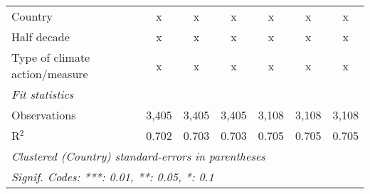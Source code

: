 \begin{tabular}{lcccccc}
   Country                                                 & x       & x             & x             & x             & x             & x\\  
   Half decade                                             & x       & x             & x             & x             & x             & x\\  
   Type of climate action/measure                          & x       & x             & x             & x             & x             & x\\  
   \midrule \emph{Fit statistics}\\
   Observations                                            & 3,405   & 3,405         & 3,405         & 3,108         & 3,108         & 3,108\\  
   R$^2$                                                   & 0.702   & 0.703         & 0.703         & 0.705         & 0.705         & 0.705\\  
   \midrule
   \multicolumn{7}{l}{\emph{Clustered (Country) standard-errors in parentheses}}\\
   \multicolumn{7}{l}{\emph{Signif. Codes: ***: 0.01, **: 0.05, *: 0.1}}\\
\end{tabular}
\par\endgroup



